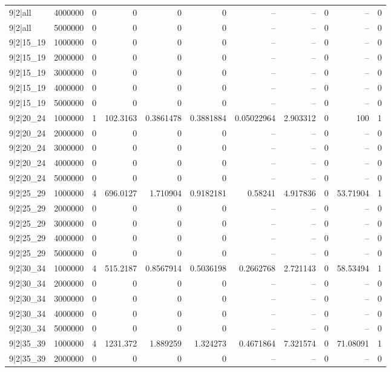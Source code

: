 \begin{tabular}{lrrrrrrrrrr}
9|2|all & 4000000 & 0 & 0 & 0 & 0 & -- & -- & 0 & -- & 0 \\
9|2|all & 5000000 & 0 & 0 & 0 & 0 & -- & -- & 0 & -- & 0 \\
9|2|15\_19 & 1000000 & 0 & 0 & 0 & 0 & -- & -- & 0 & -- & 0 \\
9|2|15\_19 & 2000000 & 0 & 0 & 0 & 0 & -- & -- & 0 & -- & 0 \\
9|2|15\_19 & 3000000 & 0 & 0 & 0 & 0 & -- & -- & 0 & -- & 0 \\
9|2|15\_19 & 4000000 & 0 & 0 & 0 & 0 & -- & -- & 0 & -- & 0 \\
9|2|15\_19 & 5000000 & 0 & 0 & 0 & 0 & -- & -- & 0 & -- & 0 \\
9|2|20\_24 & 1000000 & 1 & 102.3163 & 0.3861478 & 0.3881884 & 0.05022964 & 2.903312 & 0 & 100 & 1 \\
9|2|20\_24 & 2000000 & 0 & 0 & 0 & 0 & -- & -- & 0 & -- & 0 \\
9|2|20\_24 & 3000000 & 0 & 0 & 0 & 0 & -- & -- & 0 & -- & 0 \\
9|2|20\_24 & 4000000 & 0 & 0 & 0 & 0 & -- & -- & 0 & -- & 0 \\
9|2|20\_24 & 5000000 & 0 & 0 & 0 & 0 & -- & -- & 0 & -- & 0 \\
9|2|25\_29 & 1000000 & 4 & 696.0127 & 1.710904 & 0.9182181 & 0.58241 & 4.917836 & 0 & 53.71904 & 1 \\
9|2|25\_29 & 2000000 & 0 & 0 & 0 & 0 & -- & -- & 0 & -- & 0 \\
9|2|25\_29 & 3000000 & 0 & 0 & 0 & 0 & -- & -- & 0 & -- & 0 \\
9|2|25\_29 & 4000000 & 0 & 0 & 0 & 0 & -- & -- & 0 & -- & 0 \\
9|2|25\_29 & 5000000 & 0 & 0 & 0 & 0 & -- & -- & 0 & -- & 0 \\
9|2|30\_34 & 1000000 & 4 & 515.2187 & 0.8567914 & 0.5036198 & 0.2662768 & 2.721143 & 0 & 58.53494 & 1 \\
9|2|30\_34 & 2000000 & 0 & 0 & 0 & 0 & -- & -- & 0 & -- & 0 \\
9|2|30\_34 & 3000000 & 0 & 0 & 0 & 0 & -- & -- & 0 & -- & 0 \\
9|2|30\_34 & 4000000 & 0 & 0 & 0 & 0 & -- & -- & 0 & -- & 0 \\
9|2|30\_34 & 5000000 & 0 & 0 & 0 & 0 & -- & -- & 0 & -- & 0 \\
9|2|35\_39 & 1000000 & 4 & 1231.372 & 1.889259 & 1.324273 & 0.4671864 & 7.321574 & 0 & 71.08091 & 1 \\
9|2|35\_39 & 2000000 & 0 & 0 & 0 & 0 & -- & -- & 0 & -- & 0 \\

\end{tabular}
